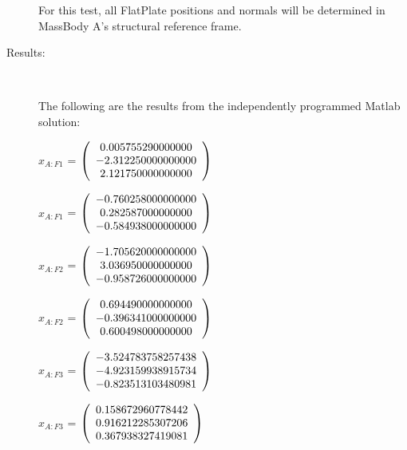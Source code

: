 \begin{description}
For this test, all FlatPlate positions and normals will be determined in
MassBody A's structural reference frame.

\item[Results:] \ \newline

The following are the results from the independently programmed Matlab solution:

$x_{A:F1}$  = $\left( \begin{array} {ccc} 0.005755290000000 \\ -2.312250000000000 \\ 2.121750000000000
\end{array} \right)\\ \\$

$\hat{x}_{A:F1}$  = $\left( \begin{array} {ccc} -0.760258000000000 \\ 0.282587000000000 \\ -0.584938000000000
\end{array} \right)\\ \\$

$x_{A:F2}$  = $\left( \begin{array} {ccc} -1.705620000000000 \\ 3.036950000000000 \\ -0.958726000000000
\end{array} \right)\\ \\$

$\hat{x}_{A:F2}$  = $\left( \begin{array} {ccc} 0.694490000000000 \\ -0.396341000000000 \\ 0.600498000000000
\end{array} \right)\\ \\$

$x_{A:F3}$  = $\left( \begin{array} {ccc} -3.524783758257438 \\ -4.923159938915734 \\ -0.823513103480981
\end{array} \right)\\ \\$

$\hat{x}_{A:F3}$  = $\left( \begin{array} {ccc} 0.158672960778442 \\ 0.916212285307206 \\ 0.367938327419081
\end{array} \right)\\ \\$


\end{description}
